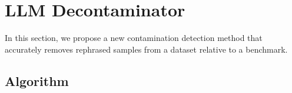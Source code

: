 \section{LLM Decontaminator}
\label{sec:llm-decontaminator}


In this section, we propose a new contamination detection method that accurately removes rephrased samples from a dataset relative to a benchmark.


\subsection{Algorithm}







